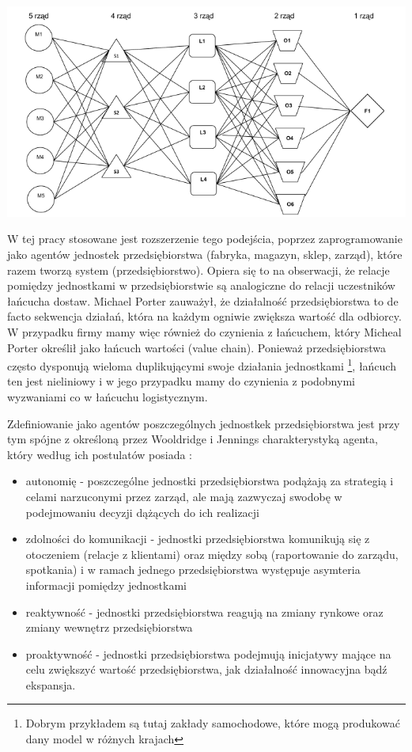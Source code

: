\documentclass{article}
\begin{document}
\includegraphics[width=\linewidth]{pictures/siec.png}

W tej pracy stosowane jest rozszerzenie tego podejścia, poprzez zaprogramowanie jako agentów jednostek przedsiębiorstwa (fabryka, magazyn, sklep, zarząd), które razem tworzą system (przedsiębiorstwo). Opiera się to na obserwacji, że relacje pomiędzy jednostkami w przedsiębiorstwie są analogiczne do relacji uczestników łańcucha dostaw. Michael Porter zauważył, że działalność przedsiębiorstwa to de facto sekwencja działań, która na każdym ogniwie zwiększa wartość dla odbiorcy. W przypadku firmy mamy więc również do czynienia z łańcuchem, który Micheal Porter określił jako łańcuch wartości (value chain).  Ponieważ przedsiębiorstwa często dysponują wieloma duplikującymi swoje działania jednostkami \footnote{Dobrym przykładem są tutaj zakłady samochodowe, które mogą produkować dany model w różnych krajach}, łańcuch ten jest nieliniowy i w jego przypadku mamy do czynienia z podobnymi wyzwaniami co w łańcuchu logistycznym.

Zdefiniowanie jako agentów poszczególnych jednostkek przedsiębiorstwa jest przy tym spójne z określoną przez Wooldridge i Jennings charakterystyką agenta, który według ich postulatów posiada : 
	\begin{itemize}
		\item autonomię - poszczególne jednostki przedsiębiorstwa podążają za strategią i celami narzuconymi przez zarząd, ale mają zazwyczaj swodobę w podejmowaniu decyzji dążących do ich realizacji
		\item zdolności do komunikacji - jednostki przedsiębiorstwa komunikują się z otoczeniem (relacje z klientami) oraz między sobą (raportowanie do zarządu, spotkania) i w ramach jednego przedsiębiorstwa występuje asymteria informacji pomiędzy jednostkami
		\item reaktywność - jednostki przedsiębiorstwa reagują na zmiany rynkowe oraz zmiany wewnętrz przedsiębiorstwa
	 	\item proaktywność - jednostki przedsiębiorstwa podejmują inicjatywy mające na celu zwiększyć wartość przedsiębiorstwa, jak działalność innowacyjna bądź ekspansja. 
	\end{itemize}

 



\end{document}
